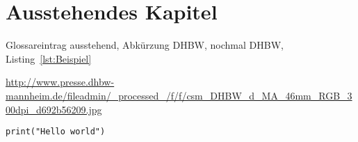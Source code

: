 \section{Ausstehendes Kapitel}

Glossareintrag \gls{ausstehend}, Abkürzung \ac{DHBW}, nochmal \ac{DHBW}, Listing~\ref{lst:Beispiel}

\begin{sloppypar}
\url{http://www.presse.dhbw-mannheim.de/fileadmin/_processed_/f/f/csm_DHBW_d_MA_46mm_RGB_300dpi_d692b56209.jpg} %
\end{sloppypar}

\begin{lstlisting}
print("Hello world")
\end{lstlisting}
